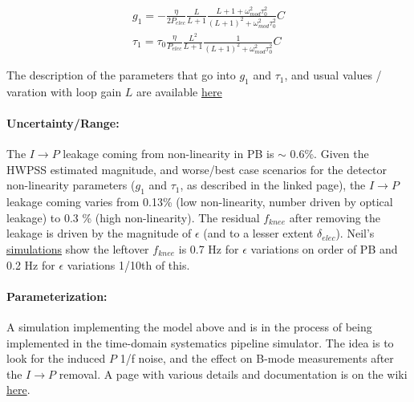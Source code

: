 \begin{align}
g_1 = -\frac{\eta}{2 P_{elec}} \frac{L}{L+1} \frac{L+1+\omega_{mod}^2 \tau_0^2}{(L+1)^2 + \omega_{mod}^2 \tau_0^2} C \\
\tau_1 = \tau_0 \frac{\eta}{P_{elec}} \frac{L^2}{L+1} \frac{1}{(L+1)^2 + \omega_{mod}^2 \tau_0^2} C
\end{align}

\noindent The description of the parameters that go into $g_1$ and $\tau_1$, and usual values / varation with loop gain $L$ are available \href{http://simonsobservatory.wdfiles.com/local--files/calandsys-telecon/hwp_systematics_pipeline_2017-05-17.pdf?ukey=b7162749d5391f6bfc1b0d7e0ed84ab97c96f6a8}{here}

\paragraph{Uncertainty/Range:}
The $I \rightarrow P$ leakage coming from non-linearity in PB is $\sim$ 0.6\%. Given the HWPSS estimated magnitude, and worse/best case scenarios for the detector non-linearity parameters ($g_1$ and $\tau_1$, as described in the linked page), the $I \rightarrow P$ leakage coming varies from 0.13\% (low non-linearity, number driven by optical leakage) to 0.3 \% (high non-linearity). The residual $f_{knee}$ after removing the leakage is driven by the magnitude of $\epsilon$ (and to a lesser extent $\delta_{elec}$). Neil's \href{http://simonsobservatory.wdfiles.com/local--files/estimationof-hwpss/Estimating_Ell_Knee_for_SOLA.pdf?ukey=886f3c1ad56d36de42412c02765a1a658a35fad9}{simulations} show the leftover $f_{knee}$ is 0.7 Hz for $\epsilon$ variations on order of PB and 0.2 Hz for $\epsilon$ variations 1/10th of this.


\paragraph{Parameterization:}
A simulation implementing the model above and is in the process of being implemented in the time-domain systematics pipeline simulator. The idea is to look for the induced $P$ 1/f noise, and the effect on B-mode measurements after the $I \rightarrow P$ removal. A page with various details and documentation is on the wiki \href{http://simonsobservatory.wikidot.com/estimationof-hwpss}{here}.
